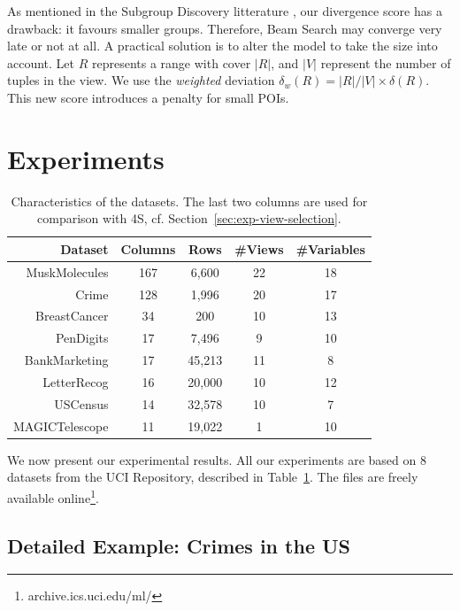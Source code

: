 As mentioned in the Subgroup Discovery litterature \cite{van2011non}, our
divergence score has a drawback: it favours smaller groups.  Therefore, Beam
Search may converge very late or not at all.  A practical
solution is to alter the model to take the size into account. Let $R$
represents a range with cover $|R|$, and $|V|$ represent the number of tuples
in the view. We use the \emph{weighted} deviation $\delta_w(R) = |R|/|V| \times
\delta(R)$. This new score introduces a penalty for small POIs.


\section{Experiments}
\label{sec:experiments}

\begin{table}
    \centering
    \small
    \begin{tabular}{r c c c c} 
        \hline
        Dataset & Columns & Rows & \#Views & \#Variables\\
        \hline
        MuskMolecules & 167 & 6,600 & 22 & 18\\
        Crime & 128 & 1,996 & 20 & 17\\
        BreastCancer & 34 & 200 & 10 & 13\\
        PenDigits & 17 & 7,496 & 9 & 10\\
        BankMarketing & 17 & 45,213 & 11& 8\\
        LetterRecog & 16 & 20,000 & 10 & 12\\
        USCensus & 14 & 32,578 & 10 & 7\\
        MAGICTelescope & 11 & 19,022 & 1 & 10\\
        \hline
    \end{tabular}
    \caption{Characteristics of the datasets. The last two columns are used for
    comparison with 4S, cf. Section~\ref{sec:exp-view-selection}.}
    \label{tab:datasets}
\end{table}
We now present our experimental results. All our experiments are based on 8
datasets from the UCI Repository, described in Table~\ref{tab:datasets}. The
files are freely available online\footnote{archive.ics.uci.edu/ml/}.

\subsection{Detailed Example: Crimes in the US}
\label{sec:crime}

